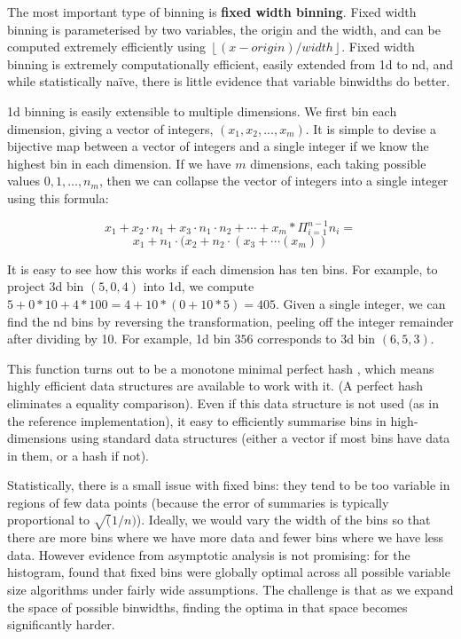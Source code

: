 \documentclass[journal]{vgtc}                %
\begin{document}
The most important type of binning is {\bf fixed width binning}. Fixed width binning is parameterised by two variables, the origin and the width, and can be computed extremely efficiently using $\left \lfloor (x - origin) / width \right \rfloor $. Fixed width binning is extremely computationally efficient, easily extended from 1d to nd, and while statistically na\"ive, there is little evidence that variable binwidths do better.

1d binning is easily extensible to multiple dimensions. We first bin each dimension, giving a vector of integers, $(x_1, x_2, ..., x_m)$. It is simple to devise a bijective map between a vector of integers and a single integer if we know the highest bin in each dimension. If we have $m$ dimensions, each taking possible values $0, 1, \ldots, n_m$, then we can collapse the vector of integers into a single integer using this formula:

\[ x_1 + x_2 \cdot n_1 + x_3 \cdot n_1 \cdot n_2 + \cdots + x_m * \Pi^{n-1}_{i = 1} n_i = \]
\[ x_1 + n_1 \cdot (x_2 + n_2 \cdot (x_3 + \cdots(x_m)) \]

It is easy to see how this works if each dimension has ten bins. For example, to project 3d bin $(5, 0, 4)$ into 1d, we compute $5 + 0 * 10 + 4 * 100 = 4 + 10 * (0 + 10 * 5) = 405$. Given a single integer, we can find the nd bins by reversing the transformation, peeling off the integer remainder after dividing by 10. For example, 1d bin $356$ corresponds to 3d bin $(6, 5, 3)$.

This function turns out to be a monotone minimal perfect hash \citep{belazzougui:2009}, which means highly efficient data structures are available to work with it. (A perfect hash eliminates a equality comparison). Even if this data structure is not used (as in the reference implementation), it easy to efficiently summarise bins in high-dimensions using standard data structures (either a vector if most bins have data in them, or a hash if not).

Statistically, there is a small issue with fixed bins: they tend to be too variable in regions of few data points (because the error of summaries is typically proportional to $\sqrt(1/n)$). Ideally, we would vary the width of the bins so that there are more bins where we have more data and fewer bins where we have less data. However evidence from asymptotic analysis is not promising: for the histogram, \cite{kogure:1987} found that fixed bins were globally optimal across all possible variable size algorithms under fairly wide assumptions. The challenge is that as we expand the space of possible binwidths, finding the optima in that space becomes significantly harder. 
\end{document}
